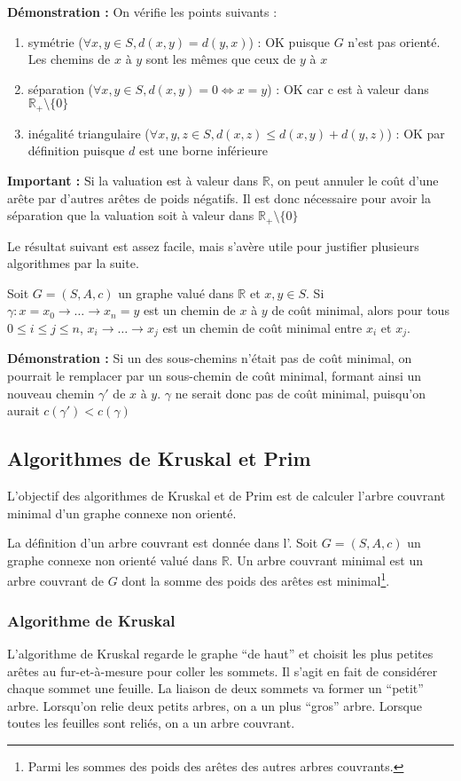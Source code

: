 \documentclass[../../../main.tex]{subfiles}
\begin{document}
\textbf{Démonstration :} On vérifie les points suivants :
\begin{enumerate}
	\item symétrie ($\forall x, y\in S, d(x, y) = d(y, x)$) : OK puisque $G$ n'est pas orienté. Les chemins de $x$ à $y$
sont les mêmes que ceux de $y$ à $x$
	\item séparation ($\forall x, y\in S, d(x, y) = 0\Leftrightarrow x = y$) : OK car c est à valeur dans $\mathbb{R}_+\setminus\{0\}$
	\item inégalité triangulaire ($\forall x, y, z\in S, d(x, z)\leq d(x, y) + d(y, z)$) : OK par définition puisque $d$ est une
borne inférieure
\end{enumerate}
\textbf{Important :} Si la valuation est à valeur dans $\mathbb{R}$, on peut annuler le coût d'une arête par d'autres
arêtes de poids négatifs. Il est donc nécessaire pour avoir la séparation que la valuation soit à valeur
dans $\mathbb{R}_+\setminus\{0\}$

Le résultat suivant est assez facile, mais s'avère utile pour justifier plusieurs algorithmes par la suite.

 Soit $G = (S, A, c)$ un graphe valué dans $\mathbb{R}$ et $x, y\in S$. Si
$\gamma : x = x_0\rightarrow \dots \rightarrow x_n = y$ est un chemin de $x$ à $y$ de coût minimal, alors pour tous $0\leq i \leq j \leq n$,
$x_i\rightarrow \dots \rightarrow x_j$ est un chemin de coût minimal entre $x_i$ et $x_j$.

\textbf{Démonstration :} Si un des sous-chemins n'était pas de coût minimal, on pourrait le remplacer par
un sous-chemin de coût minimal, formant ainsi un nouveau chemin $\gamma'$ de $x$ à $y$. $\gamma$ ne serait donc pas
de coût minimal, puisqu'on aurait $c(\gamma') < c(\gamma)$
\subsection{Algorithmes de Kruskal et Prim}
L'objectif des algorithmes de Kruskal et de Prim est de calculer l'arbre couvrant minimal d'un graphe
connexe non orienté.

La définition d'un arbre couvrant est donnée dans l'.
 {
	Soit $G = (S, A, c)$ un graphe connexe non orienté valué dans $\mathbb{R}$. Un arbre couvrant minimal est
un arbre couvrant de $G$ dont la somme des poids des arêtes est minimal\footnote{Parmi les sommes des poids des arêtes des autres arbres couvrants.}.
}
\subsubsection{Algorithme de Kruskal}
L'algorithme de Kruskal regarde le graphe ``de haut'' et choisit les plus petites arêtes au fur-et-à-mesure
pour coller les sommets. Il s'agit en fait de considérer chaque sommet une feuille. La liaison de deux
sommets va former un ``petit'' arbre. Lorsqu'on relie deux petits arbres, on a un plus ``gros'' arbre.
Lorsque toutes les feuilles sont reliés, on a un arbre couvrant.
\end{document}
